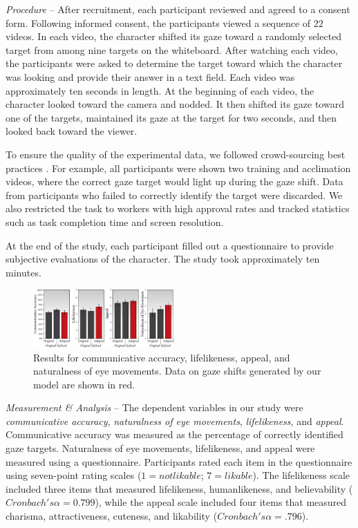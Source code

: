 \textit{Procedure} -- After recruitment, each participant reviewed and agreed to a consent form. Following informed consent, the participants viewed a sequence of $22$ videos. In each video, the character shifted its gaze toward a randomly selected target from among nine targets on the whiteboard. After watching each video, the participants were asked to determine the target toward which the character was looking and provide their answer in a text field. Each video was approximately ten seconds in length. At the beginning of each video, the character looked toward the camera and nodded. It then shifted its gaze toward one of the targets, maintained its gaze at the target for two seconds, and then looked back toward the viewer.

To ensure the quality of the experimental data, we followed crowd-sourcing best practices \cite{kittur2008mturk}. For example, all participants were shown two training and acclimation videos, where    the correct gaze target would light up during the gaze shift. Data from participants who failed to correctly identify the target were discarded. We also restricted the task to workers with high approval rates and tracked statistics such as task completion time and screen resolution.

At the end of the study, each participant filled out a questionnaire to provide subjective evaluations of the character. The study took approximately ten minutes.

\begin{figure}[!b]
\centering
\vspace{-8pt}
\includegraphics[width=0.48\textwidth]{Figures/Results.pdf}
\caption{Results for communicative accuracy, lifelikeness, appeal, and naturalness of eye movements. Data on gaze shifts generated by our model are shown in red.}
\vspace{-8pt}
\label{fig:StudyResults}
\end{figure}

\textit{Measurement \& Analysis} -- The dependent variables in our study were \textit{communicative accuracy}, \textit{naturalness of eye movements}, \textit{lifelikeness}, and \textit{appeal}. Communicative accuracy was measured as the percentage of correctly identified gaze targets. Naturalness of eye movements, lifelikeness, and appeal were measured using a questionnaire. Participants rated each item in the questionnaire using seven-point rating scales ($1 = not likable$; $7 = likable$). The lifelikeness scale included three items that measured lifelikeness, humanlikeness, and believability ($Cronbach's \alpha = 0.799$), while the appeal scale included four items that measured charisma, attractiveness, cuteness, and likability ($Cronbach's \alpha = .796$).


